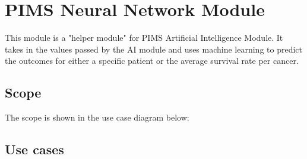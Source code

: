 \section{PIMS Neural Network Module}
This module is a "helper module" for PIMS Artificial Intelligence Module. It takes in the values passed by the AI module and uses machine learning to predict the outcomes for either a specific patient or the average survival rate per cancer. \par 

\subsection{Scope}
The scope is shown in the use case diagram below: \par

\subsection{Use cases}

	
